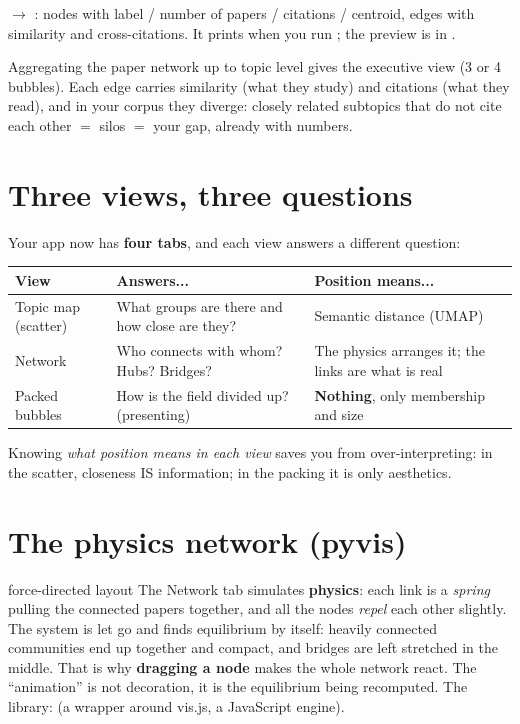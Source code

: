 \documentclass[11pt,a4paper]{article}
\begin{document}
 $\rightarrow$ : nodes with
label / number of papers / citations / centroid, edges with similarity and cross-citations. It
prints when you run ; the preview is in
.

\begin{resumen}
Aggregating the paper network up to topic level gives the executive view (3 or 4 bubbles).
Each edge carries similarity (what they study) and citations (what they read), and in your
corpus they diverge: closely related subtopics that do not cite each other $=$ silos $=$ your
gap, already with numbers.
\end{resumen}
\clearpage
{}
{}

\section{Three views, three questions}

Your app now has \textbf{four tabs}, and each view answers a different question:

\begin{center}
\begin{tabular}{lp{5.2cm}p{4.6cm}}
\textbf{View} & \textbf{Answers...} & \textbf{Position means...} \\
\hline
Topic map (scatter) & What groups are there and how close are they? & Semantic distance (UMAP) \\
Network & Who connects with whom? Hubs? Bridges? & The physics arranges it; the links are what is real \\
Packed bubbles & How is the field divided up? (presenting) & \textbf{Nothing}, only membership and size \\
\end{tabular}
\end{center}

Knowing \emph{what position means in each view} saves you from over-interpreting: in the
scatter, closeness IS information; in the packing it is only aesthetics.

\section{The physics network (pyvis)}

\begin{concepto}{force-directed layout}
The Network tab simulates \textbf{physics}: each link is a \emph{spring} pulling the connected
papers together, and all the nodes \emph{repel} each other slightly. The system is let go and
finds equilibrium by itself: heavily connected communities end up together and compact, and
bridges are left stretched in the middle. That is why \textbf{dragging a node} makes the whole
network react. The ``animation'' is not decoration, it is the equilibrium being recomputed.
The library:  (a wrapper around vis.js, a JavaScript engine).
\end{concepto}
\end{document}
